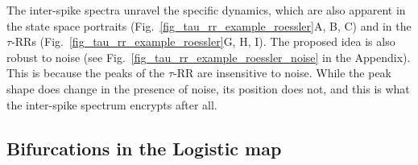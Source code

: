 \documentclass[entropy,article,submit,pdftex,moreauthors]{Definitions/mdpi}
\begin{document}
The inter-spike spectra unravel the specific dynamics, which are also apparent in the state space portraits (Fig.~\ref{fig_tau_rr_example_roessler}A, B, C) and in the 
$\tau$-RRs (Fig.~\ref{fig_tau_rr_example_roessler}G, H, I). The proposed idea is also 
robust to noise (see Fig.~\ref{fig_tau_rr_example_roessler_noise} in the Appendix). This is because the peaks of the $\tau$-RR are insensitive to noise. While the peak shape does 
change in the presence of noise, its position does not, and this is what the inter-spike spectrum encrypts after all.



\subsection{Bifurcations in the Logistic map}
\end{document}
